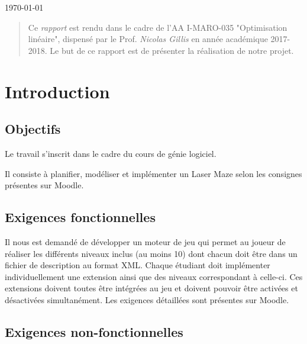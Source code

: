 \documentclass[]{article}
\newcommand{\placeholder}[1]{{\noindent \color{red}[ #1 ]}}
\begin{document}
\bigskip
\begin{center} \today \end{center}
\begin{abstract}
Ce \emph{rapport} est rendu dans le cadre de l'AA \textsf{I-MARO-035} "Optimisation linéaire", dispensé par le Prof. \emph{Nicolas Gillis} en année académique 2017-2018. Le but de ce rapport est de présenter la réalisation de notre projet.
\end{abstract}

\newpage
\section{Introduction}\label{sec:intro}


\subsection{Objectifs}



Le travail s'inscrit dans le cadre du cours de génie logiciel.

Il consiste à planifier, modéliser et implémenter un Laser Maze selon les consignes présentes sur Moodle. 


\subsection{Exigences fonctionnelles}

Il nous est demandé de développer un moteur de jeu qui permet au joueur de réaliser les différents niveaux inclus (au moins 10) dont chacun doit être dans un fichier de description au format XML.
Chaque étudiant doit implémenter individuellement une extension ainsi que des niveaux correspondant à celle-ci.
Ces extensions doivent toutes être intégrées au jeu et doivent pouvoir
être activées et désactivées simultanément. Les exigences détaillées sont présentes sur Moodle.

\subsection{Exigences non-fonctionnelles}
\end{document}
